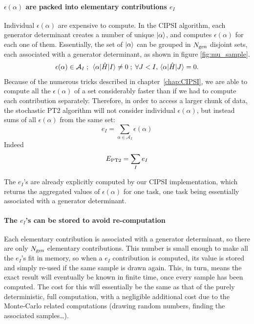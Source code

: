 \documentclass[./thesis.tex]{subfiles}
\begin{document}
\paragraph{$\epsilon(\alpha)$ are packed into elementary contributions $e_I$}
Individual $\epsilon(\alpha)$ are expensive to compute. In the CIPSI algorithm, each generator determinant creates a number of unique ${\ket{\alpha}}$, and computes $\epsilon(\alpha)$ for each one of them.
Essentially, the set of ${\ket{\alpha}}$ can be grouped in ${N_\text{gen}}$ disjoint sets, each associated with a generator determinant, as shown in figure \ref{fig:mu_sample}.
\begin{equation}
\epsilon(\alpha) \in \mathcal{A}_I \; ; \; \mel{\alpha}{\hat{H}}{I} \neq 0 \; ; \;   \forall J < I, \mel{\alpha}{\hat{H}}{J} = 0.
\end{equation}
Because of the numerous tricks described in chapter~\ref{chap:CIPSI}, we are able to compute all the $\epsilon(\alpha)$ of a set considerably faster than if we had to compute each contribution separately. Therefore, in order to access a larger chunk of data, the stochastic PT2 algorithm will not consider individual $\epsilon(\alpha)$, but instead sums of all $\epsilon(\alpha)$ from the same set:
\begin{equation}
e_I = \sum_{\alpha \in \mathcal{A}_I} \epsilon(\alpha)
\end{equation}
Indeed
\begin{equation}
E_\text{PT2} = \sum_{I} e_I
\end{equation}

The $e_I$'s are already explicitly computed by our CIPSI implementation, which returns the aggregated values of $\epsilon(\alpha)$ for one task, one task being essentially associated with a generator determinant.

\paragraph{The $e_I$'s can be stored to avoid re-computation}
Each elementary contribution is associated with a generator determinant, so there are only ${N_\text{gen}}$ elementary contributions. This number is small enough to make all the $e_I$'s fit in memory, so when a $e_I$ contribution is computed, its value is stored and simply re-used if the same sample is drawn again. This, in turn, means the exact result will eventually be known in finite time, once every sample has been computed. The cost for this will essentially be the same as that of the purely deterministic, full computation, with a negligible additional cost due to the Monte-Carlo related computations (drawing random numbers, finding the associated samples\dots).
\end{document}
